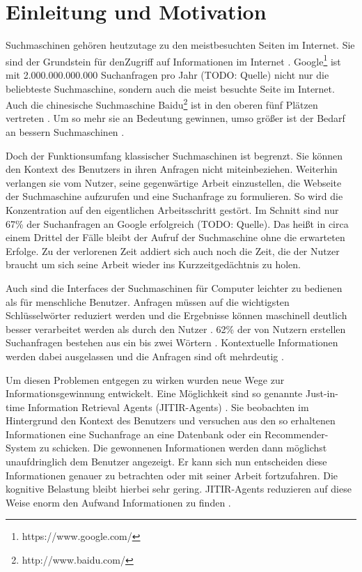 \section{Einleitung und Motivation}
Suchmaschinen gehören heutzutage zu den meistbesuchten Seiten im Internet. Sie sind der Grundstein für denZugriff auf Informationen im Internet \cite{budzik1999watson}. Google\footnote{https://www.google.com/} ist mit 2.000.000.000.000 Suchanfragen pro Jahr (TODO: Quelle) nicht nur die beliebteste Suchmaschine, sondern auch die meist besuchte Seite im Internet. Auch die chinesische Suchmaschine Baidu\footnote{http://www.baidu.com/} ist in den oberen fünf Plätzen vertreten \cite{alexa}. Um so mehr sie an Bedeutung gewinnen, umso größer ist der Bedarf an bessern Suchmaschinen \cite{lawrence2000context}.

Doch der Funktionsumfang klassischer Suchmaschinen ist begrenzt. Sie können den Kontext des Benutzers in ihren Anfragen nicht miteinbeziehen. Weiterhin verlangen sie vom Nutzer, seine gegenwärtige Arbeit einzustellen, die Webseite der Suchmaschine aufzurufen und eine Suchanfrage zu formulieren. So wird die Konzentration auf den eigentlichen Arbeitsschritt gestört. Im Schnitt sind nur 67\% der Suchanfragen an Google erfolgreich (TODO: Quelle). Das heißt in circa einem Drittel der Fälle bleibt der Aufruf der Suchmaschine ohne die erwarteten Erfolge. Zu der verlorenen Zeit addiert sich auch noch die Zeit, die der Nutzer braucht um sich seine Arbeit wieder ins Kurzzeitgedächtnis zu holen.

Auch sind die Interfaces der Suchmaschinen für Computer leichter zu bedienen als für menschliche Benutzer. Anfragen müssen auf die wichtigsten Schlüsselwörter reduziert werden und die Ergebnisse können maschinell deutlich besser verarbeitet werden als durch den Nutzer \cite{budzik1999watson}. 62\% der von Nutzern erstellen Suchanfragen bestehen aus ein bis zwei Wörtern \cite{jansen2000real}. Kontextuelle Informationen werden dabei ausgelassen und die Anfragen sind oft mehrdeutig \cite{budzik1999watson}.

Um diesen Problemen entgegen zu wirken wurden neue Wege zur Informationsgewinnung entwickelt. Eine Möglichkeit sind so genannte Just-in-time Information Retrieval Agents (JITIR-Agents) \cite{rhodes2000just}. Sie beobachten im Hintergrund den Kontext des Benutzers und versuchen aus den so erhaltenen Informationen eine Suchanfrage an eine Datenbank oder ein Recommender-System zu schicken. Die gewonnenen Informationen werden dann möglichst unaufdringlich dem Benutzer angezeigt. Er kann sich nun entscheiden diese Informationen genauer zu betrachten oder mit seiner Arbeit fortzufahren. Die kognitive Belastung bleibt hierbei sehr gering. JITIR-Agents reduzieren auf diese Weise enorm den Aufwand Informationen zu finden \cite{rhodes2000just}.

